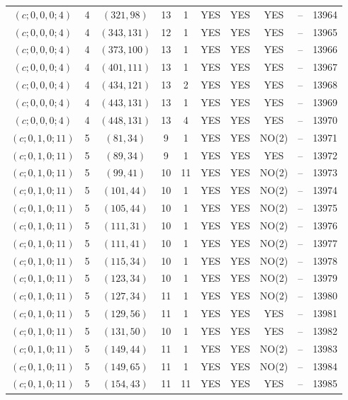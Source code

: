 \begin{longtable}{|c|c|c|c|c|c|c|c|c|c|}
$(c; 0, 0, 0; 4)$ & 4 & $(321, 98)$ & 13 & 1 & YES & YES & YES & -- & 13964\\
$(c; 0, 0, 0; 4)$ & 4 & $(343, 131)$ & 12 & 1 & YES & YES & YES & -- & 13965\\
$(c; 0, 0, 0; 4)$ & 4 & $(373, 100)$ & 13 & 1 & YES & YES & YES & -- & 13966\\
$(c; 0, 0, 0; 4)$ & 4 & $(401, 111)$ & 13 & 1 & YES & YES & YES & -- & 13967\\
$(c; 0, 0, 0; 4)$ & 4 & $(434, 121)$ & 13 & 2 & YES & YES & YES & -- & 13968\\
$(c; 0, 0, 0; 4)$ & 4 & $(443, 131)$ & 13 & 1 & YES & YES & YES & -- & 13969\\
$(c; 0, 0, 0; 4)$ & 4 & $(448, 131)$ & 13 & 4 & YES & YES & YES & -- & 13970\\
$(c; 0, 1, 0; 11)$ & 5 & $(81, 34)$ & 9 & 1 & YES & YES & NO(2) & -- & 13971\\
$(c; 0, 1, 0; 11)$ & 5 & $(89, 34)$ & 9 & 1 & YES & YES & YES & -- & 13972\\
$(c; 0, 1, 0; 11)$ & 5 & $(99, 41)$ & 10 & 11 & YES & YES & NO(2) & -- & 13973\\
$(c; 0, 1, 0; 11)$ & 5 & $(101, 44)$ & 10 & 1 & YES & YES & NO(2) & -- & 13974\\
$(c; 0, 1, 0; 11)$ & 5 & $(105, 44)$ & 10 & 1 & YES & YES & NO(2) & -- & 13975\\
$(c; 0, 1, 0; 11)$ & 5 & $(111, 31)$ & 10 & 1 & YES & YES & NO(2) & -- & 13976\\
$(c; 0, 1, 0; 11)$ & 5 & $(111, 41)$ & 10 & 1 & YES & YES & NO(2) & -- & 13977\\
$(c; 0, 1, 0; 11)$ & 5 & $(115, 34)$ & 10 & 1 & YES & YES & NO(2) & -- & 13978\\
$(c; 0, 1, 0; 11)$ & 5 & $(123, 34)$ & 10 & 1 & YES & YES & NO(2) & -- & 13979\\
$(c; 0, 1, 0; 11)$ & 5 & $(127, 34)$ & 11 & 1 & YES & YES & NO(2) & -- & 13980\\
$(c; 0, 1, 0; 11)$ & 5 & $(129, 56)$ & 11 & 1 & YES & YES & YES & -- & 13981\\
$(c; 0, 1, 0; 11)$ & 5 & $(131, 50)$ & 10 & 1 & YES & YES & YES & -- & 13982\\
$(c; 0, 1, 0; 11)$ & 5 & $(149, 44)$ & 11 & 1 & YES & YES & NO(2) & -- & 13983\\
$(c; 0, 1, 0; 11)$ & 5 & $(149, 65)$ & 11 & 1 & YES & YES & NO(2) & -- & 13984\\
$(c; 0, 1, 0; 11)$ & 5 & $(154, 43)$ & 11 & 11 & YES & YES & YES & -- & 13985\\

\end{longtable}
